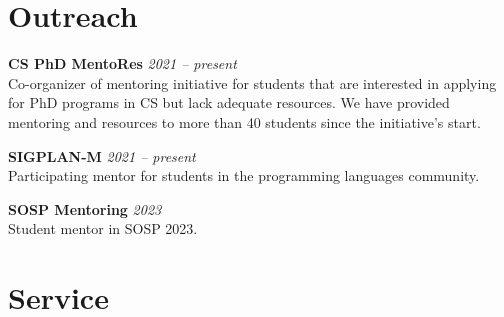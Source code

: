 \documentclass[margin]{res}
\begin{document}
\begin{resume}







\section{Outreach}
\hypertarget{sec:outreach}{}

\textbf{CS PhD MentoRes}  \hfill {\em 2021 -- present} \\
Co-organizer of mentoring initiative for students that are interested in applying for PhD programs in CS but lack adequate resources. We have provided mentoring and resources to more than 40 students since the initiative's start.

\textbf{SIGPLAN-M}  \hfill {\em 2021 -- present} \\
Participating mentor for students in the programming languages community.

\textbf{SOSP Mentoring}  \hfill {\em 2023} \\
Student mentor in SOSP 2023.

\section{Service}
\hypertarget{sec:service}{}


\end{resume}
\end{document}
